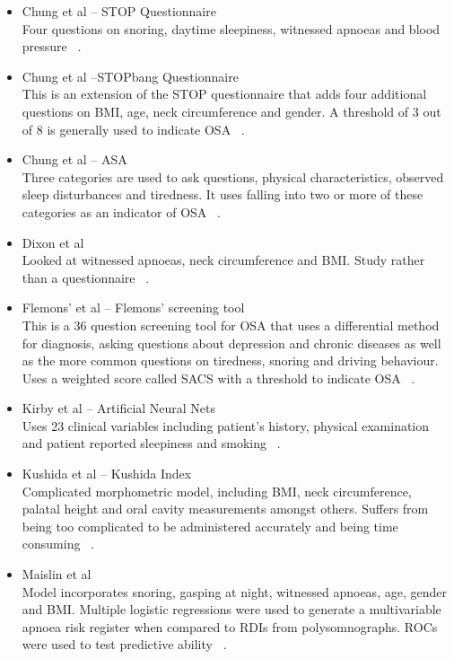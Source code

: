 \begin{itemize}
\item Chung et al – STOP Questionnaire \\
Four questions on snoring, daytime sleepiness, witnessed apnoeas and blood pressure ~\cite{chung2008stop}.
\item Chung et al –STOPbang Questionnaire \\
This is an extension of the STOP questionnaire that adds four additional questions on BMI, age, neck circumference and gender. A threshold of 3 out of 8 is generally used to indicate OSA ~\cite{chung2012high}.
\item Chung et al – ASA \\
Three categories are used to ask questions, physical characteristics, observed sleep disturbances and tiredness. It uses falling into two or more of these categories as an indicator of OSA ~\cite{chung2008validation}.
\item Dixon et al \\
Looked at witnessed apnoeas, neck circumference and BMI. Study rather than a questionnaire ~\cite{dixon2003predicting}.
\item Flemons’ et al – Flemons’ screening tool \\
This is a 36 question screening tool for OSA that uses a differential method for diagnosis, asking questions about depression and chronic diseases as well as the more common questions on tiredness, snoring and driving behaviour. Uses a weighted score called SACS with a threshold to indicate OSA ~\cite{flemons1994likelihood}.
\item Kirby et al – Artificial Neural Nets \\
Uses 23 clinical variables including patient’s history, physical examination and patient reported sleepiness and smoking ~\cite{kirby1999neural}.
\item Kushida et al – Kushida Index \\
Complicated morphometric model, including BMI, neck circumference, palatal height and oral cavity measurements amongst others. Suffers from being too complicated to be administered accurately and being time consuming ~\cite{kushida1997predictive}.
\item Maislin et al \\
Model incorporates snoring, gasping at night, witnessed apnoeas, age, gender and BMI. Multiple logistic regressions were used to generate a multivariable apnoea risk register when compared to RDIs from polysomnographs. ROCs were used to test predictive ability ~\cite{dinges1995survey}.

\end{itemize}
